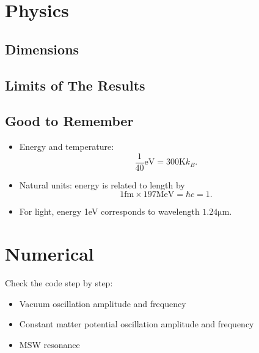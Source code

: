 \documentclass{sciposter}
\begin{document}
\begin{multicols}{3}


\section{Physics}

\subsection{Dimensions}



\subsection{Limits of The Results}


\subsection{Good to Remember}

\begin{itemize}
\item Energy and temperature: \begin{equation}
\frac{1}{40}\mathrm{eV} = 300\mathrm{K} k_B .
\end{equation}
\item Natural units: energy is related to length by
\begin{equation}
1\mathrm{fm}\times 197\mathrm{MeV}=\hbar c = 1.
\end{equation}
\item For light, energy 1eV corresponds to wavelength $1.24\mathrm{\mu m}$.
\end{itemize}




\section{Numerical}
Check the code step by step:

\begin{itemize}
\item Vacuum oscillation amplitude and frequency
\item Constant matter potential oscillation amplitude and frequency
\item MSW resonance
\end{itemize}




\end{multicols}
\end{document}
